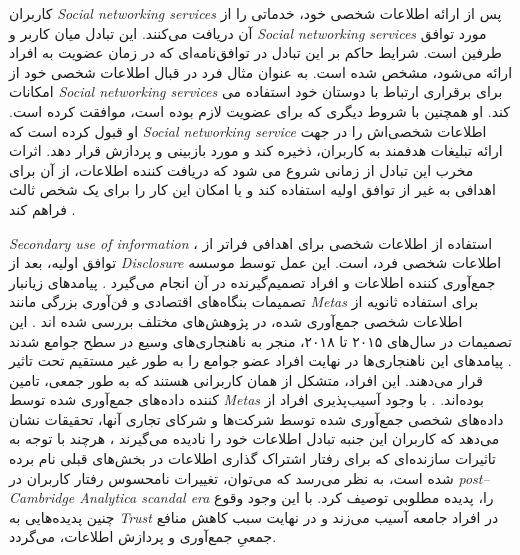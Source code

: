کاربران
\textit{
  \glspl{Social networking service}
}
پس از ارائه اطلاعات شخصی خود، خدماتی را از آن دریافت می‌کنند. این
تبادل میان کاربر و
\textit{
  \glspl{Social networking service}
}
مورد توافق طرفین است. شرایط حاکم بر این تبادل در توافق‌نامه‌ای
که در زمان عضویت به افراد ارائه می‌شود، مشخص شده است. به عنوان مثال
فرد در قبال اطلاعات شخصی خود از امکانات
\textit{
  \glspl{Social networking service}
}
برای برقراری ارتباط با دوستان خود استفاده می کند. او همچنین
با شروط دیگری که  برای عضویت لازم بوده است، موافقت کرده است. او
قبول کرده است که
\textit{
  \gls{Social networking service}
}
اطلاعات شخصی‌اش را در جهت ارائه تبلیغات هدفمند به کاربران، ذخیره کند
و مورد بازبینی و پردازش قرار دهد. اثرات مخرب این تبادل از زمانی شروع می شود که دریافت کننده اطلاعات، از
آن برای اهدافی به غیر از توافق اولیه استفاده کند و یا امکان این کار را برای یک شخص ثالث فراهم کند
.

\textit{
  \gls{Secondary use of information}
}،
استفاده از اطلاعات شخصی برای اهدافی فراتر
از توافق اولیه، بعد از
\textit{
  \gls{Disclosure}
}
اطلاعات شخصی فرد، است. این عمل توسط موسسه جمع‌آوری کننده اطلاعات
و افراد تصمیم‌گیرنده در آن انجام می‌گیرد
.
پیامد‌های زیانبار تصمیمات بنگاه‌های اقتصادی و فن‌آوری بزرگی
مانند
\textit{
  \glspl{Meta}
}
برای استفاده ثانویه از اطلاعات شخصی جمع‌آوری شده، در پژوهش‌های مختلف بررسی شده اند
.
این تصمیمات در سال‌های ۲۰۱۵ تا ۲۰۱۸، منجر به ناهنجاری‌های وسیع در سطح جوامع شدند
.
پیامدهای این ناهنجاری‌ها در نهایت افراد عضو جوامع را به طور غیر مستقیم
تحت تاثیر قرار می‌دهند. این افراد، متشکل از همان کاربرانی هستند که به طور جمعی، تامین کننده
داده‌های جمع‌آوری شده توسط
\textit{
  \glspl{Meta}
}
بوده‌اند.
.
با وجود آسیب‌پذیری افراد از داده‌های شخصی جمع‌آوری شده توسط شرکت‌ها
و شرکای تجاری آنها، تحقیقات نشان می‌دهد
که کاربران این جنبه تبادل اطلاعات خود را نادیده می‌گیرند
،
هرچند با توجه به تاثیرات سازنده‌ای که برای رفتار اشتراک گذاری اطلاعات در بخش‌های
قبلی نام برده شده است، به نظر می‌رسد که می‌توان، تغییرات نامحسوس رفتار کاربران در
\textit{
  \gls{post–Cambridge Analytica scandal era}
}
را، پدیده مطلوبی توصیف کرد. با این وجود وقوع چنین پدیده‌هایی به 
\textit{
  \gls{Trust}
}
 در افراد جامعه آسیب می‌زند و در نهایت سبب کاهش منافع جمعیِ جمع‌آوری و پردازش اطلاعات، می‌گردد.


